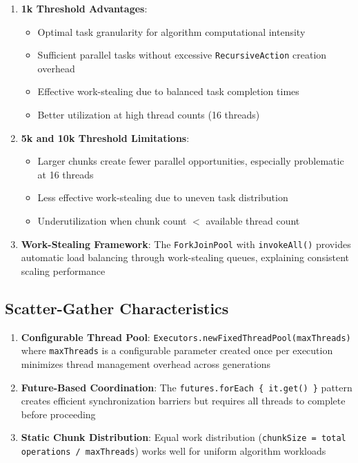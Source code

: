 \begin{enumerate}
   \item \textbf{1k Threshold Advantages}:
      \begin{itemize}
      \item Optimal task granularity for algorithm computational intensity
      \item Sufficient parallel tasks without excessive \texttt{RecursiveAction} creation overhead
      \item Effective work-stealing due to balanced task completion times
      \item Better utilization at high thread counts (16 threads)
      \end{itemize}

   \item \textbf{5k and 10k Threshold Limitations}:
      \begin{itemize}
      \item Larger chunks create fewer parallel opportunities, especially problematic at 16 threads
      \item Less effective work-stealing due to uneven task distribution
      \item Underutilization when chunk count $<$ available thread count
      \end{itemize}

   \item \textbf{Work-Stealing Framework}: The \texttt{ForkJoinPool} with \texttt{invokeAll()} provides automatic load balancing through work-stealing queues, explaining consistent scaling performance
\end{enumerate}

\subsection{Scatter-Gather Characteristics}

\begin{enumerate}
   \item \textbf{Configurable Thread Pool}: \texttt{Executors.newFixedThreadPool(maxThreads)} where \texttt{maxThreads} is a configurable parameter created once per execution minimizes thread management overhead across generations
   \item \textbf{Future-Based Coordination}: The \texttt{futures.forEach \{ it.get() \}} pattern creates efficient synchronization barriers but requires all threads to complete before proceeding
   \item \textbf{Static Chunk Distribution}: Equal work distribution (\texttt{chunkSize = total operations / maxThreads}) works well for uniform algorithm workloads
\end{enumerate}

